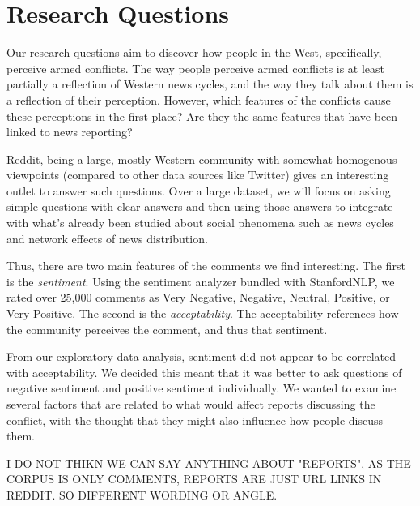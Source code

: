 \section{Research Questions}
Our research questions aim to discover how people in the West, specifically, perceive armed conflicts. The way people perceive armed conflicts is at least partially a reflection of Western news cycles, and the way they talk about them is a reflection of their perception. However, which features of the conflicts cause these perceptions in the first place? Are they the same features that have been linked to news reporting?

Reddit, being a large, mostly Western community with somewhat homogenous viewpoints (compared to other data sources like Twitter) gives an interesting outlet to answer such questions. Over a large dataset, we will focus on asking simple questions with clear answers and then using those answers to integrate with what's already been studied about social phenomena such as news cycles and network effects of news distribution. 

Thus, there are two main features of the comments we find interesting. The first is the \textit{sentiment}. Using the sentiment analyzer bundled with StanfordNLP\cite{stanfordnlp}, we rated over 25,000 comments as Very Negative, Negative, Neutral, Positive, or Very Positive. The second is the \textit{acceptability}. The acceptability references how the community perceives the comment, and thus that sentiment. 

From our exploratory data analysis, sentiment did not appear to be correlated with acceptability. We decided this meant that it was better to ask questions of negative sentiment and positive sentiment individually. We wanted to examine several factors that are related to what would affect reports discussing the conflict, with the thought that they might also influence how people discuss them.

I DO NOT THIKN WE CAN SAY ANYTHING ABOUT "REPORTS", AS THE CORPUS IS ONLY COMMENTS, REPORTS ARE JUST URL LINKS IN REDDIT. SO DIFFERENT WORDING OR ANGLE.

